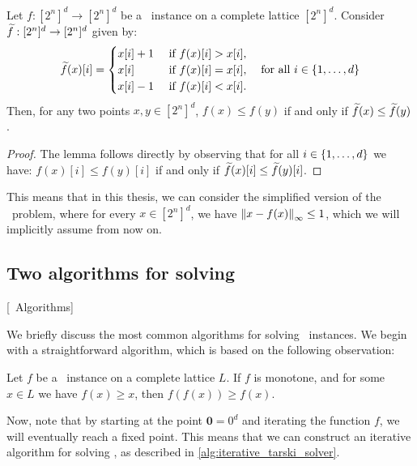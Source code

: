 \begin{lemma}
	Let $f : [2^n]^d \rightarrow [2^n]^d$ be a \Tarski\ instance on a complete lattice $[2^n]^d$. Consider $\widetilde{f} : [2^n]^d \rightarrow [2^n]^d$ given by: 
	\begin{align*}
		\widetilde{f}(x)[i] = \begin{cases}
			                x[i] + 1 & \text{ if } f(x)[i] > x[i], \\
			                x[i]     & \text{ if } f(x)[i] = x[i], \\
			                x[i] - 1 & \text{ if } f(x)[i] < x[i].
		                \end{cases} \quad \text{for all $i \in \left\{1, \dots, d\right\}$}
	\end{align*}
	Then, for any two points $x, y \in [2^n]^d$, $f(x) \leq f(y)$ if and only if $\widetilde{f}(x) \leq \widetilde{f}(y)$.
\end{lemma}
\begin{proof}
	The lemma follows directly by observing that for all $i \in \left\{1, \dots, d\right\}$ we have: $f(x)[i] \leq f(y)[i]$ if and only if $\widetilde{f}(x)[i] \leq \widetilde{f}(y)[i]$.
\end{proof}
This means that in this thesis, we can consider the simplified version of the \Tarski\ problem, where for every $x \in [2^n]^d$, we have $\left\lVert x - f(x)\right\rVert_{\infty} \leq 1$, which we will implicitly assume from now on.

\subsection{Two algorithms for solving \Tarski}[\Tarski\ Algorithms]
\label{sec:tarski_algorithms}

We briefly discuss the most common algorithms for solving \Tarski\ instances. We begin with a straightforward algorithm, which is based on the following observation:
\begin{remark}
	Let $f$ be a \Tarski\ instance on a complete lattice $L$. If $f$ is monotone, and for some $x \in L$ we have $f(x) \geq x$, then $f(f(x)) \geq f(x)$.
\end{remark}
Now, note that by starting at the point $\mathbf{0} = 0^d$ and iterating the function $f$, we will eventually reach a fixed point. This means that we can construct an iterative algorithm for solving \Tarski, as described in \cref{alg:iterative_tarski_solver}.

